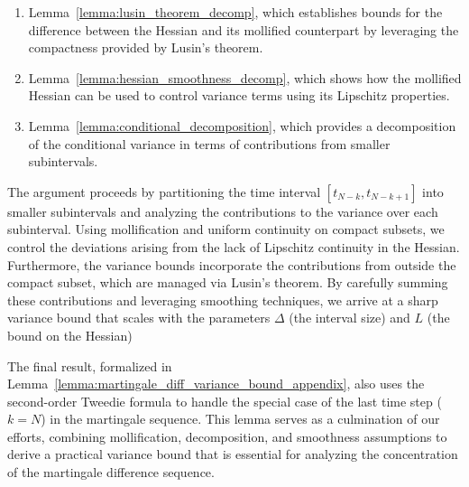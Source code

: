 \begin{enumerate}
    \item Lemma~\ref{lemma:lusin_theorem_decomp}, which establishes bounds for the difference between the Hessian and its mollified counterpart by leveraging the compactness provided by Lusin’s theorem.
    \item Lemma~\ref{lemma:hessian_smoothness_decomp}, which shows how the mollified Hessian can be used to control variance terms using its Lipschitz properties.
    \item Lemma~\ref{lemma:conditional_decomposition}, which provides a decomposition of the conditional variance in terms of contributions from smaller subintervals.
\end{enumerate}

The argument proceeds by partitioning the time interval \([t_{N-k}, t_{N-k+1}]\) into smaller subintervals and analyzing the contributions to the variance over each subinterval. Using mollification and uniform continuity on compact subsets, we control the deviations arising from the lack of Lipschitz continuity in the Hessian. Furthermore, the variance bounds incorporate the contributions from outside the compact subset, which are managed via Lusin's theorem. By carefully summing these contributions and leveraging smoothing techniques, we arrive at a sharp variance bound that scales with the parameters \(\Delta\) (the interval size) and \(L\) (the bound on the Hessian) 

The final result, formalized in Lemma~\ref{lemma:martingale_diff_variance_bound_appendix}, also uses the second-order Tweedie formula to handle the special case of the last time step (\(k = N\)) in the martingale sequence. This lemma serves as a culmination of our efforts, combining mollification, decomposition, and smoothness assumptions to derive a practical variance bound that is essential for analyzing the concentration of the martingale difference sequence.


